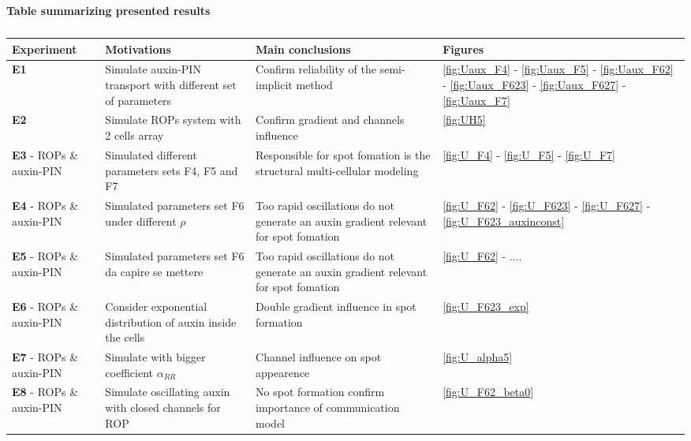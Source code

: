  \begin{table}[H]
   \caption*{\textbf{Table summarizing presented results}}
     \begin{tabular}{|p{3cm} |p{4cm} p{4cm} p{3cm}|}
     \hline
     \textbf{Experiment} & \textbf{Motivations} & \textbf{Main conclusions} & \textbf{Figures} \T\B \\
     \hline \hline
     \textbf{E1} & Simulate auxin-PIN transport with different set of parameters & Confirm reliability of the semi-implicit method & \ref{fig:Uaux_F4} - \ref{fig:Uaux_F5} - \ref{fig:Uaux_F62} - \ref{fig:Uaux_F623} - \ref{fig:Uaux_F627} - \ref{fig:Uaux_F7} \T\B\\
     \hline
     \textbf{E2} & Simulate ROPs system with 2 cells array & Confirm gradient and channels influence & \ref{fig:UH5} \T\B\\
     \hline
     \textbf{E3} - ROPs \& auxin-PIN & Simulated different parameters sets F4, F5 and F7 & Responsible for spot fomation is the structural multi-cellular modeling & \ref{fig:U_F4} - \ref{fig:U_F5} - \ref{fig:U_F7}\T\B\\
     \hline
     \textbf{E4} - ROPs \& auxin-PIN & Simulated parameters set F6 under different $\rho$ & Too rapid oscillations do not generate an auxin gradient relevant for spot fomation & \ref{fig:U_F62} - \ref{fig:U_F623} - \ref{fig:U_F627} - \ref{fig:U_F623_auxinconst} \T\B\\
     \hline
     \textbf{E5} - ROPs \& auxin-PIN & Simulated parameters set F6 da capire se mettere & Too rapid oscillations do not generate an auxin gradient relevant for spot fomation & \ref{fig:U_F62} - .... \T\B\\
     \hline
     \textbf{E6} - ROPs \& auxin-PIN & Consider exponential distribution of auxin inside the cells & Double gradient influence in spot formation & \ref{fig:U_F623_exp} \T\B\\
     \hline
     \textbf{E7} - ROPs \& auxin-PIN & Simulate with bigger coefficient $\alpha_{RR}$  & Channel influence on spot appearence & \ref{fig:U_alpha5} \T\B\\
     \hline
     \textbf{E8} - ROPs \& auxin-PIN & Simulate oscillating auxin with closed channels for ROP & No spot formation confirm importance of communication model & \ref{fig:U_F62_beta0} \T\B\\
     \hline
     \end{tabular}
     \\[10pt]
     \caption[Table summarizing auxin-PIN and RR results on two cells system]{}
     \label{table:aux_summaryRes}
 \end{table}
